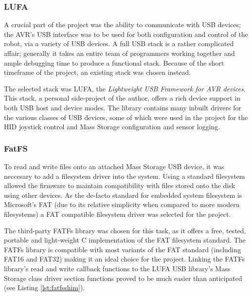 \FloatBarrier
\subsubsection{LUFA}

A crucial part of the project was the ability to communicate with USB devices; the AVR's USB interface was to be used for both configuration and control of the robot, via a variety of USB devices. A full USB stack is a rather complicated affair; generally it takes an entire team of programmers working together and ample debugging time to produce a functional stack. Because of the short timeframe of the project, an existing stack was chosen instead.

The selected stack was LUFA, the \textit{Lightweight USB Framework for AVR devices}. This stack, a personal side-project of the author, offers a rich device support in both USB host and device modes. The library contains many inbuilt drivers for the various classes of USB devices, some of which were used in the project for the HID joystick control and Mass Storage configuration and sensor logging.

\FloatBarrier
\subsubsection{FatFS}

To read and write files onto an attached Mass Storage USB device, it was neccesary to add a filesystem driver into the system. Using a standard filesystem allowed the firmware to maintain compatibility with files stored onto the disk using other devices. As the de-facto standard for embedded system filesystem is Microsoft's FAT (due to its relative simplicity when compared to more modern filesystems) a FAT compatible filesystem driver was selected for the project.

The third-party FATFs library was chosen for this task, as it offers a free, tested, portable and light-weight C implementation of the FAT filesystem standard. The FATFs library is compatible with most variants of the FAT standard (including FAT16 and FAT32) making it an ideal choice for the project. Linking the FATFs library's read and write callback functions to the LUFA USB library's Mass Storage class driver section functions proved to be much easier than anticipated (see Listing \ref{lst:fatfsshim}).



